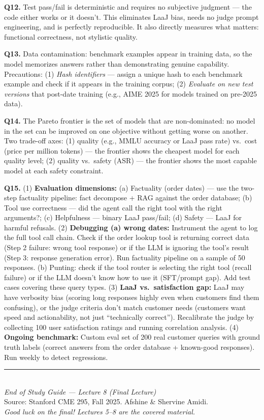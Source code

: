 \documentclass[11pt, a4paper]{article}
\begin{document}
\textbf{Q12.} Test pass/fail is deterministic and requires no subjective judgment --- the code either works or it doesn't. This eliminates LaaJ bias, needs no judge prompt engineering, and is perfectly reproducible. It also directly measures what matters: functional correctness, not stylistic quality.

\textbf{Q13.} Data contamination: benchmark examples appear in training data, so the model memorizes answers rather than demonstrating genuine capability. Precautions: (1) \emph{Hash identifiers} --- assign a unique hash to each benchmark example and check if it appears in the training corpus; (2) \emph{Evaluate on new test versions} that post-date training (e.g., AIME 2025 for models trained on pre-2025 data).

\textbf{Q14.} The Pareto frontier is the set of models that are non-dominated: no model in the set can be improved on one objective without getting worse on another. Two trade-off axes: (1) quality (e.g., MMLU accuracy or LaaJ pass rate) vs.\ cost (price per million tokens) --- the frontier shows the cheapest model for each quality level; (2) quality vs.\ safety (ASR) --- the frontier shows the most capable model at each safety constraint.

\textbf{Q15.} (1) \textbf{Evaluation dimensions:} (a) Factuality (order dates) --- use the two-step factuality pipeline: fact decompose + RAG against the order database; (b) Tool use correctness --- did the agent call the right tool with the right arguments?; (c) Helpfulness --- binary LaaJ pass/fail; (d) Safety --- LaaJ for harmful refusals. (2) \textbf{Debugging (a) wrong dates:} Instrument the agent to log the full tool call chain. Check if the order lookup tool is returning correct data (Step 2 failure: wrong tool response) or if the LLM is ignoring the tool's result (Step 3: response generation error). Run factuality pipeline on a sample of 50 responses. (b) Punting: check if the tool router is selecting the right tool (recall failure) or if the LLM doesn't know how to use it (SFT/prompt gap). Add test cases covering these query types. (3) \textbf{LaaJ vs.\ satisfaction gap:} LaaJ may have verbosity bias (scoring long responses highly even when customers find them confusing), or the judge criteria don't match customer needs (customers want speed and actionability, not just ``technically correct''). Recalibrate the judge by collecting 100 user satisfaction ratings and running correlation analysis. (4) \textbf{Ongoing benchmark:} Custom eval set of 200 real customer queries with ground truth labels (correct answers from the order database + known-good responses). Run weekly to detect regressions.

\vspace{1em}
\begin{center}
\rule{0.5\textwidth}{0.4pt}\\[6pt]
{\small\textit{End of Study Guide --- Lecture 8 (Final Lecture)}}\\[4pt]
{\small Source: Stanford CME 295, Fall 2025. Afshine \& Shervine Amidi.}\\[4pt]
{\small\textit{Good luck on the final! Lectures 5--8 are the covered material.}}
\end{center}
\end{document}
